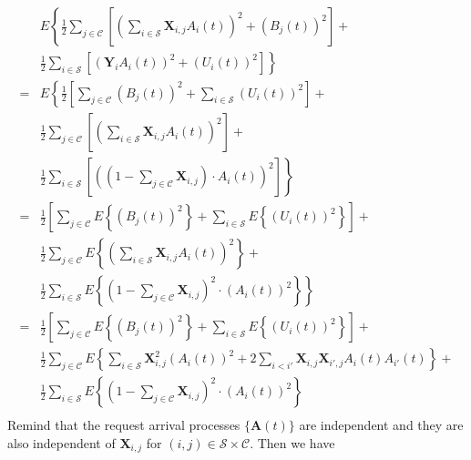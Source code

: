 \documentclass[10pt,journal,compsoc]{IEEEtran}
\begin{document}
\begin{equation}
	\begin{array}{cl}
		& \displaystyle E\left\{ \frac{1}{2} \sum_{j \in \mathcal{C}} \left[ \left( \sum_{i \in \mathcal{S}} \mathbf{X}_{i,j} A_i(t) \right)^2  + \left( B_j(t) \right)^2 \right] + \right. \\
		& \displaystyle \left. \frac{1}{2} \sum_{i \in \mathcal{S}} \left[ \left( \mathbf{Y}_{i} A_i(t) \right)^2  + \left( U_i(t) \right)^2 \right] \right\} \\
		= & \displaystyle E \left\{ \frac{1}{2} \left[ \sum_{j \in \mathcal{C}} \left( B_j(t) \right)^2 + \sum_{i \in \mathcal{S}} \left( U_i(t) \right)^2 \right] + \right. \\
		& \displaystyle \frac{1}{2} \sum_{j \in \mathcal{C}} \left[ \left( \sum_{i \in \mathcal{S}} \mathbf{X}_{i,j} A_i(t) \right)^2 \right] +  \\
		& \displaystyle \left. \frac{1}{2} \sum_{i \in \mathcal{S}} \left[ \left( (1 - \sum_{j \in \mathcal{C}} \mathbf{X}_{i,j}) \cdot A_i(t) \right)^2 \right] \right\} \\
		= & \displaystyle \frac{1}{2} \left[ \sum_{j \in \mathcal{C}} E\left\{ \left( B_j(t) \right)^2 \right\} + \sum_{i \in \mathcal{S}} E\left\{ \left( U_i(t) \right)^2 \right\} \right] + \\
		& \displaystyle \frac{1}{2} \sum_{j \in \mathcal{C}} E \left\{ \left( \sum_{i \in \mathcal{S}} \mathbf{X}_{i,j} A_i(t) \right)^2 \right\} + \\
		& \displaystyle \left. \frac{1}{2} \sum_{i \in \mathcal{S}} E \left\{ (1 - \sum_{j \in \mathcal{C}} \mathbf{X}_{i,j})^2 \cdot \left(A_i(t)\right)^2 \right\} \right\} \\
		= & \displaystyle \frac{1}{2} \left[ \sum_{j \in \mathcal{C}} E\left\{ \left( B_j(t) \right)^2 \right\} + \sum_{i \in \mathcal{S}} E\left\{ \left( U_i(t) \right)^2 \right\} \right] + \\
		& \displaystyle \frac{1}{2} \sum_{j \in \mathcal{C}} E \left\{ \sum_{i \in \mathcal{S}} \mathbf{X}_{i,j}^2 \left(A_i(t)\right)^2 + 2\sum_{i < i'} \mathbf{X}_{i,j}\mathbf{X}_{i',j} A_{i}(t) A_{i'}(t) \right\} + \\
		& \displaystyle \frac{1}{2} \sum_{i \in \mathcal{S}} E \left\{ (1 - \sum_{j \in \mathcal{C}} \mathbf{X}_{i,j})^2 \cdot \left(A_i(t)\right)^2 \right\} \\
	\end{array}
\end{equation}
Remind that the request arrival processes $\{\mathbf{A}(t)\}$ are independent and they are also independent of $\mathbf{X}_{i,j}$ for $(i,j) \in \mathcal{S} \times \mathcal{C}$. Then we have
\end{document}
